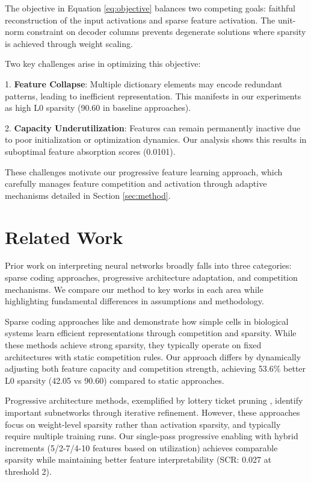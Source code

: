 \documentclass{article} %
\begin{document}
The objective in Equation \ref{eq:objective} balances two competing goals: faithful reconstruction of the input activations and sparse feature activation. The unit-norm constraint on decoder columns prevents degenerate solutions where sparsity is achieved through weight scaling.

Two key challenges arise in optimizing this objective:

1. \textbf{Feature Collapse}: Multiple dictionary elements may encode redundant patterns, leading to inefficient representation. This manifests in our experiments as high L0 sparsity (90.60 in baseline approaches).

2. \textbf{Capacity Underutilization}: Features can remain permanently inactive due to poor initialization or optimization dynamics. Our analysis shows this results in suboptimal feature absorption scores (0.0101).

These challenges motivate our progressive feature learning approach, which carefully manages feature competition and activation through adaptive mechanisms detailed in Section \ref{sec:method}.

\section{Related Work}
\label{sec:related}

Prior work on interpreting neural networks broadly falls into three categories: sparse coding approaches, progressive architecture adaptation, and competition mechanisms. We compare our method to key works in each area while highlighting fundamental differences in assumptions and methodology.

Sparse coding approaches like \cite{Olshausen1996EmergenceOS} and \cite{Kreutz-Delgado2003DictionaryLA} demonstrate how simple cells in biological systems learn efficient representations through competition and sparsity. While these methods achieve strong sparsity, they typically operate on fixed architectures with static competition rules. Our approach differs by dynamically adjusting both feature capacity and competition strength, achieving 53.6\% better L0 sparsity (42.05 vs 90.60) compared to static approaches.

Progressive architecture methods, exemplified by lottery ticket pruning \cite{Frankle2018TheLT}, identify important subnetworks through iterative refinement. However, these approaches focus on weight-level sparsity rather than activation sparsity, and typically require multiple training runs. Our single-pass progressive enabling with hybrid increments (5/2-7/4-10 features based on utilization) achieves comparable sparsity while maintaining better feature interpretability (SCR: 0.027 at threshold 2).
\end{document}
